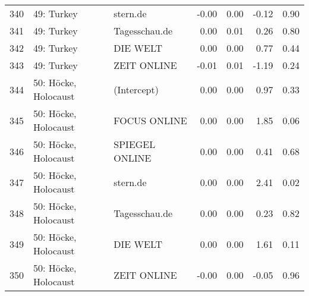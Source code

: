 \begin{table}[ht]
{\begin{tabular}{rllrrrr}
  340 & 49: Turkey & stern.de & -0.00 & 0.00 & -0.12 & 0.90 \\ 
  341 & 49: Turkey & Tagesschau.de & 0.00 & 0.01 & 0.26 & 0.80 \\ 
  342 & 49: Turkey & DIE WELT & 0.00 & 0.00 & 0.77 & 0.44 \\ 
  343 & 49: Turkey & ZEIT ONLINE & -0.01 & 0.01 & -1.19 & 0.24 \\ 
  344 & 50: Höcke, Holocaust & (Intercept) & 0.00 & 0.00 & 0.97 & 0.33 \\ 
  345 & 50: Höcke, Holocaust & FOCUS ONLINE & 0.00 & 0.00 & 1.85 & 0.06 \\ 
  346 & 50: Höcke, Holocaust & SPIEGEL ONLINE & 0.00 & 0.00 & 0.41 & 0.68 \\ 
  347 & 50: Höcke, Holocaust & stern.de & 0.00 & 0.00 & 2.41 & 0.02 \\ 
  348 & 50: Höcke, Holocaust & Tagesschau.de & 0.00 & 0.00 & 0.23 & 0.82 \\ 
  349 & 50: Höcke, Holocaust & DIE WELT & 0.00 & 0.00 & 1.61 & 0.11 \\ 
  350 & 50: Höcke, Holocaust & ZEIT ONLINE & -0.00 & 0.00 & -0.05 & 0.96 \\ 
   \hline
\end{tabular}
}
\end{table}
